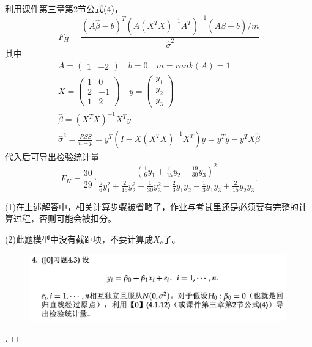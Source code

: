\documentclass[cn,hazy,green,12pt,normal]{elegantnote}
\numberwithin{equation}{section}
\numberwithin{subsection}{section}
\begin{document}
利用课件第三章第2节公式(4)，
$$
F_H = \frac{(A \hat{\beta} - b)^T (A(X^T X)^{-1}A^T)^{-1} (A \hat{\beta} - b) / m}{\hat{\sigma}^2}
$$
其中
\begin{gather*}
A = 
\begin{pmatrix}
1 & -2    
\end{pmatrix}
\quad b = 0 \quad m = rank(A) = 1 \\
X = 
\begin{pmatrix}
    1 & 0 \\
    2 & -1  \\
    1 & 2
\end{pmatrix}
\quad y = 
\begin{pmatrix}
    y_1 \\
    y_2 \\
    y_3
\end{pmatrix} \\
\hat{\beta} = (X^T X)^{-1} X^T y \\
\hat{\sigma}^2 = \frac{RSS}{n-p} = y^T(I-X(X^T X)^{-1}X^T)y = y^T y - y^T X \hat{\beta}
\end{gather*}
代入后可导出检验统计量
$$
F_H = \frac{30}{29} \cdot \frac{(\frac{1}{6}y_1 + \frac{11}{15}y_2 - \frac{19}{30}y_3)^2}{\frac{5}{6}y_1^2 + \frac{2}{15}y_2^2 + \frac{1}{30}y_3^2 - \frac{2}{3}y_1y_2 - \frac{1}{3}y_1y_3 + \frac{2}{15}y_2y_3}.
$$

\begin{note}
    (1)在上述解答中，相关计算步骤被省略了，作业与考试里还是必须要有完整的计算过程，否则可能会被扣分。
    
    \noindent (2)此题模型中没有截距项，不要计算成$X_c$了。
\end{note}

\newpage

\begin{homework}
\end{homework}

    \begin{figure}[!htbp]
        \centering
        \includegraphics[width=30em]{image/hw4_plt4.png}
    \end{figure}

\begin{proof}[\solutionname]
\end{proof}
\end{document}
